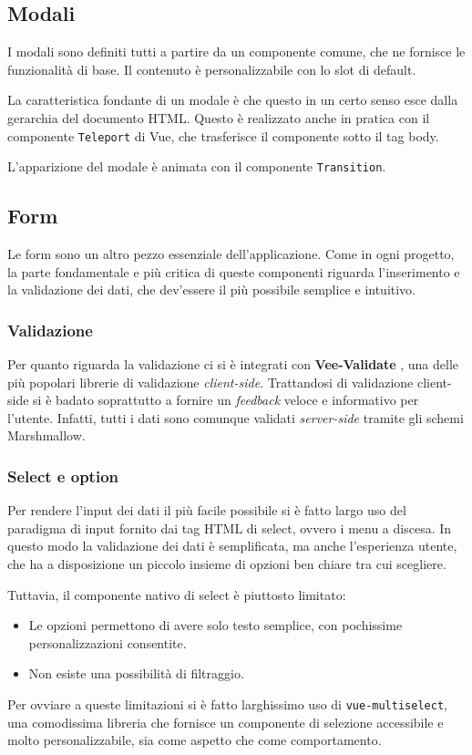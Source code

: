 \subsection{Modali}
I modali sono definiti tutti a partire da un componente comune, che ne fornisce le funzionalità di base. Il contenuto è personalizzabile con lo slot di default.

La caratteristica fondante di un modale è che questo in un certo senso esce dalla gerarchia del documento HTML. Questo è realizzato anche in pratica con il componente \texttt{Teleport} di Vue, che trasferisce il componente sotto il tag body.

L'apparizione del modale è animata con il componente \texttt{Transition}.

\subsection{Form}
Le form sono un altro pezzo essenziale dell'applicazione. Come in ogni progetto, la parte fondamentale e più critica di queste componenti riguarda l'inserimento e la validazione dei dati, che dev'essere il più possibile semplice e intuitivo.

\subsubsection{Validazione}
Per quanto riguarda la validazione ci si è integrati con \textbf{Vee-Validate} \cite{vee-validate}, una delle più popolari librerie di validazione \emph{client-side}. Trattandosi di validazione client-side si è badato soprattutto a fornire un \emph{feedback} veloce e informativo per l'utente. Infatti, tutti i dati sono comunque validati \emph{server-side} tramite gli schemi Marshmallow.

\subsubsection{Select e option}
Per rendere l'input dei dati il più facile possibile si è fatto largo uso del paradigma di input fornito dai tag HTML di select, ovvero i menu a discesa. In questo modo la validazione dei dati è semplificata, ma anche l'esperienza utente, che ha a disposizione un piccolo insieme di opzioni ben chiare tra cui scegliere.

Tuttavia, il componente nativo di select è piuttosto limitato:
\begin{itemize}
    \item Le opzioni permettono di avere solo testo semplice, con pochissime personalizzazioni consentite.
    \item Non esiste una possibilità di filtraggio.
\end{itemize}
Per ovviare a queste limitazioni si è fatto larghissimo uso di \texttt{vue-multiselect}, una comodissima libreria che fornisce un componente di selezione accessibile e molto personalizzabile, sia come aspetto che come comportamento.

